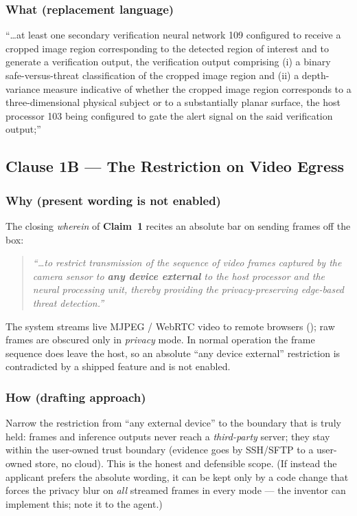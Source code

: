 \documentclass[12pt,a4paper]{article}
\newcommand{\clm}[1]{\textbf{Claim~#1}}
\begin{document}
\subsubsection{What (replacement language)}
\begin{whatbox}
``\ldots at least one secondary verification neural network 109 configured to receive a
cropped image region corresponding to the detected region of interest and to generate a
verification output, the verification output comprising (i) a binary safe-versus-threat
classification of the cropped image region and (ii) a depth-variance measure indicative of
whether the cropped image region corresponds to a three-dimensional physical subject or to a
substantially planar surface, the host processor 103 being configured to gate the alert
signal on the said verification output;''
\end{whatbox}

\subsection{Clause 1B --- The Restriction on Video Egress}

\subsubsection{Why (present wording is not enabled)}
The closing \emph{wherein} of \clm{1} recites an absolute bar on sending frames off the box:

\begin{quote}\itshape
``\ldots to restrict transmission of the sequence of video frames captured by the camera
sensor to \textbf{any device external} to the host processor and the neural processing
unit, thereby providing the privacy-preserving edge-based threat detection.''
\end{quote}

The system streams live MJPEG / WebRTC video to remote browsers
(); raw frames are obscured only in \emph{privacy} mode. In
normal operation the frame sequence does leave the host, so an absolute ``any device
external'' restriction is contradicted by a shipped feature and is not enabled.

\subsubsection{How (drafting approach)}
Narrow the restriction from ``any external device'' to the boundary that is truly held:
frames and inference outputs never reach a \emph{third-party} server; they stay within the
user-owned trust boundary (evidence goes by SSH/SFTP to a user-owned store, no cloud). This
is the honest and defensible scope. (If instead the applicant prefers the absolute wording,
it can be kept only by a code change that forces the privacy blur on \emph{all} streamed
frames in every mode --- the inventor can implement this; note it to the agent.)
\end{document}
